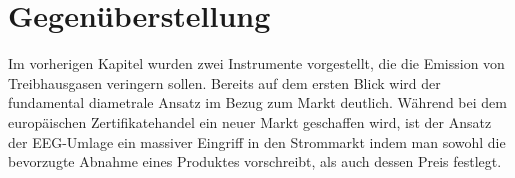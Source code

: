 \chapter{Gegenüberstellung}
Im vorherigen Kapitel wurden zwei Instrumente vorgestellt, die die Emission von Treibhausgasen veringern sollen.
Bereits auf dem ersten Blick wird der fundamental diametrale Ansatz im Bezug zum Markt deutlich.
Während bei dem europäischen Zertifikatehandel ein neuer Markt geschaffen wird, ist der Ansatz der EEG-Umlage ein massiver Eingriff in den Strommarkt indem man sowohl die bevorzugte Abnahme eines Produktes vorschreibt, als auch dessen Preis festlegt.
